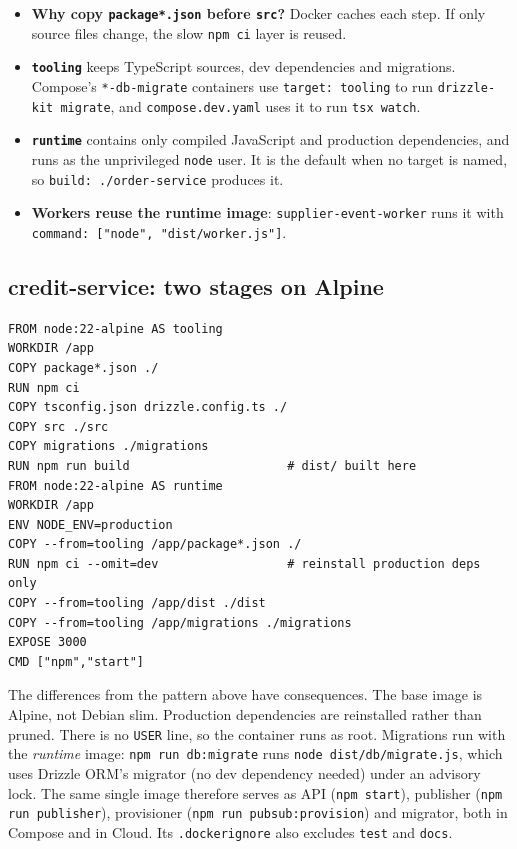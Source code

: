 \documentclass[11pt,a4paper]{article}
\newcommand{\code}[1]{\nolinkurl{#1}}
\begin{document}
\begin{itemize}
  \item \textbf{Why copy \code{package*.json} before \code{src}?} Docker caches each step.
  If only source files change, the slow \code{npm ci} layer is reused.
  \item \textbf{\code{tooling}} keeps TypeScript sources, dev dependencies and migrations.
  Compose's \code{*-db-migrate} containers use \code{target: tooling} to run
  \code{drizzle-kit migrate}, and \code{compose.dev.yaml} uses it to run \code{tsx watch}.
  \item \textbf{\code{runtime}} contains only compiled JavaScript and production
  dependencies, and runs as the unprivileged \code{node} user. It is the default when no
  target is named, so \code{build: ./order-service} produces it.
  \item \textbf{Workers reuse the runtime image}: \code{supplier-event-worker} runs it
  with \code{command: ["node", "dist/worker.js"]}.
\end{itemize}

\subsection{credit-service: two stages on Alpine}

\par\noindent\begin{minipage}{\linewidth}
\begin{lstlisting}[language=docker]
FROM node:22-alpine AS tooling
WORKDIR /app
COPY package*.json ./
RUN npm ci
COPY tsconfig.json drizzle.config.ts ./
COPY src ./src
COPY migrations ./migrations
RUN npm run build                      # dist/ built here
FROM node:22-alpine AS runtime
WORKDIR /app
ENV NODE_ENV=production
COPY --from=tooling /app/package*.json ./
RUN npm ci --omit=dev                  # reinstall production deps only
COPY --from=tooling /app/dist ./dist
COPY --from=tooling /app/migrations ./migrations
EXPOSE 3000
CMD ["npm","start"]
\end{lstlisting}
\end{minipage}\par

The differences from the pattern above have consequences. The base image is Alpine, not
Debian slim. Production dependencies are reinstalled rather than pruned. There is no
\code{USER} line, so the container runs as root. Migrations run with the
\emph{runtime} image: \code{npm run db:migrate} runs \code{node dist/db/migrate.js},
which uses Drizzle ORM's migrator (no dev dependency needed) under an advisory lock. The
same single image therefore serves as API (\code{npm start}), publisher
(\code{npm run publisher}), provisioner (\code{npm run pubsub:provision}) and migrator,
both in Compose and in Cloud. Its \code{.dockerignore} also excludes \code{test} and
\code{docs}.
\end{document}

